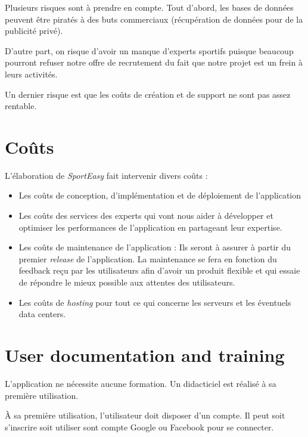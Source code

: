 Plusieurs risques sont à prendre en compte. Tout d'abord, les bases de données peuvent être piratés à des buts commerciaux (récupération de données pour de la publicité privé). 

D'autre part, on risque d'avoir un manque d'experts sportifs puisque beaucoup pourront refuser notre offre de recrutement du fait que notre projet est un frein à leurs activités.

Un dernier risque est que les coûts de création et de support ne sont pas assez rentable.

\section{Coûts}

L'élaboration de \textit{SportEasy} fait intervenir divers coûts :

\begin{itemize}

\item Les coûts de conception, d'implémentation et de déploiement de l'application

\item Les coûts des services des experts qui vont nous aider à développer et optimiser les performances de l'application en partageant leur expertise.

\item Les coûts de maintenance de l'application : Ils seront à assurer à partir du premier \textit{release} de l'application. La maintenance se fera en fonction du feedback reçu par les utilisateurs afin d'avoir un produit flexible et qui essaie de répondre le mieux possible aux attentes des utilisateurs.

\item Les coûts de \textit{hosting} pour tout ce qui concerne les serveurs et les éventuels data centers.

\end{itemize}

\section{User documentation and training}

L'application ne nécessite aucune formation. Un didacticiel est réalisé à sa première utilisation.

À sa première utilisation, l'utilisateur doit disposer d'un compte. Il peut soit s'inscrire soit utiliser sont compte Google ou Facebook pour se connecter.

